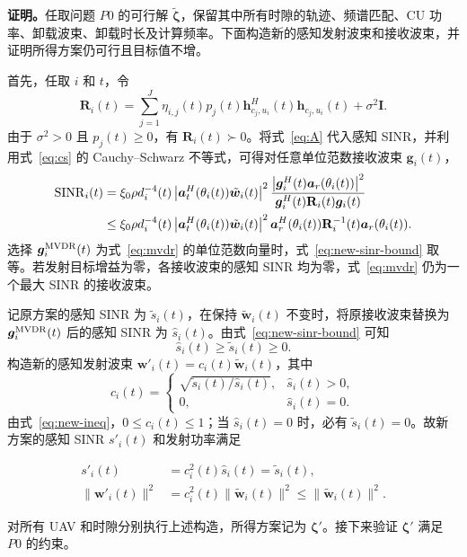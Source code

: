 \documentclass[11pt,a4paper]{ctexart}
\begin{document}
\medskip
\noindent\textbf{证明。}任取问题 $P0$ 的可行解 $\tilde{\bm\zeta}$，保留其中所有时隙的轨迹、频谱匹配、CU 功率、卸载波束、卸载时长及计算频率。下面构造新的感知发射波束和接收波束，并证明所得方案仍可行且目标值不增。

首先，任取 $i$ 和 $t$，令
\begin{equation}\label{eq:new-cov}
\mathbf R_i(t)=\sum_{j=1}^{J}\eta_{i,j}(t)p_j(t)
\bm h_{c_j,u_i}^{H}(t)\bm h_{c_j,u_i}(t)+\sigma^2\mathbf I.
\end{equation}
由于 $\sigma^2>0$ 且 $p_j(t)\ge0$，有 $\mathbf R_i(t)\succ0$。将式~\eqref{eq:A} 代入感知 SINR，并利用式~\eqref{eq:cs} 的 Cauchy--Schwarz 不等式，可得对任意单位范数接收波束 $\bm g_i(t)$，
\begin{align}\label{eq:new-sinr-bound}
\operatorname{SINR}_i(t)
&=\xi_0\rho d_i^{-4}(t)\left|\bm a_t^H(\theta_i(t))\tilde{\bm w}_i(t)\right|^2
\frac{\left|\bm g_i^H(t)\bm a_r(\theta_i(t))\right|^2}
{\bm g_i^H(t)\mathbf R_i(t)\bm g_i(t)}\notag\\
&\le\xi_0\rho d_i^{-4}(t)\left|\bm a_t^H(\theta_i(t))\tilde{\bm w}_i(t)\right|^2
\bm a_r^H(\theta_i(t))\mathbf R_i^{-1}(t)\bm a_r(\theta_i(t)).
\end{align}
选择 $\bm g_i^{\rm MVDR}(t)$ 为式~\eqref{eq:mvdr} 的单位范数向量时，式~\eqref{eq:new-sinr-bound} 取等。若发射目标增益为零，各接收波束的感知 SINR 均为零，式~\eqref{eq:mvdr} 仍为一个最大 SINR 的接收波束。

记原方案的感知 SINR 为 $\tilde s_i(t)$，在保持 $\tilde{\bm w}_i(t)$ 不变时，将原接收波束替换为 $\bm g_i^{\rm MVDR}(t)$ 后的感知 SINR 为 $\hat s_i(t)$。由式~\eqref{eq:new-sinr-bound} 可知
\begin{equation}\label{eq:new-ineq}
\hat s_i(t)\ge\tilde s_i(t)\ge0.
\end{equation}
构造新的感知发射波束 $\bm w'_i(t)=c_i(t)\tilde{\bm w}_i(t)$，其中
\begin{equation}\label{eq:new-scale}
c_i(t)=
\begin{cases}
\sqrt{\tilde s_i(t)/\hat s_i(t)},&\hat s_i(t)>0,\\
0,&\hat s_i(t)=0.
\end{cases}
\end{equation}
由式~\eqref{eq:new-ineq}，$0\le c_i(t)\le1$；当 $\hat s_i(t)=0$ 时，必有 $\tilde s_i(t)=0$。故新方案的感知 SINR $s'_i(t)$ 和发射功率满足
\begin{samepage}
\begin{align}\label{eq:new-same-sinr}
s'_i(t)&=c_i^2(t)\hat s_i(t)=\tilde s_i(t),\\
\|\bm w'_i(t)\|^2&=c_i^2(t)\|\tilde{\bm w}_i(t)\|^2\le\|\tilde{\bm w}_i(t)\|^2.\label{eq:new-power}
\end{align}
\end{samepage}
对所有 UAV 和时隙分别执行上述构造，所得方案记为 $\bm\zeta'$。接下来验证 $\bm\zeta'$ 满足 $P0$ 的约束。
\end{document}

